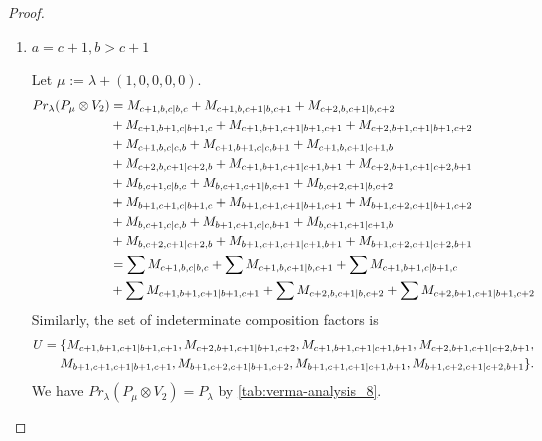 \begin{proof}
\begin{enumerate}
\begin{enumerate}
      \item $a=c+1, b>c+1$ \par
        Let $\mu:=\lambda + (1,0,0,0,0) $.
        \begin{equation}\notag
          \begin{aligned}
            Pr_{\lambda}(P_\mu \otimes V_{2}) &=
M_{c+1,b,c|b,c}
+ M_{c+1,b,c+1|b,c+1}
+ M_{c+2,b,c+1|b,c+2}\\
                                            &
+ M_{c+1,b+1,c|b+1,c}
+ M_{c+1,b+1,c+1|b+1,c+1}
+ M_{c+2,b+1,c+1|b+1,c+2}\\
                                            &
+ M_{c+1,b,c|c,b}
+ M_{c+1,b+1,c|c,b+1}
+ M_{c+1,b,c+1|c+1,b}\\
                                            &
+ M_{c+2,b,c+1|c+2,b}
+ M_{c+1,b+1,c+1|c+1,b+1}
+ M_{c+2,b+1,c+1|c+2,b+1}\\
                                            &
+ M_{b,c+1,c|b,c}
+ M_{b,c+1,c+1|b,c+1}
+ M_{b,c+2,c+1|b,c+2}\\
                                            &
+ M_{b+1,c+1,c|b+1,c}
+ M_{b+1,c+1,c+1|b+1,c+1}
+ M_{b+1,c+2,c+1|b+1,c+2}\\
                                            &
+ M_{b,c+1,c|c,b}
+ M_{b+1,c+1,c|c,b+1}
+ M_{b,c+1,c+1|c+1,b}\\
                                            &
+ M_{b,c+2,c+1|c+2,b}
+ M_{b+1,c+1,c+1|c+1,b+1}
+ M_{b+1,c+2,c+1|c+2,b+1} \\
                                               &=
\sum M_{c+1,b,c|b,c}
+ \sum M_{c+1,b,c+1|b,c+1}
+ \sum M_{c+1,b+1,c|b+1,c}\\
                                            &
+ \sum M_{c+1,b+1,c+1|b+1,c+1}
+ \sum M_{c+2,b,c+1|b,c+2}
+ \sum M_{c+2,b+1,c+1|b+1,c+2}
          \end{aligned}
        \end{equation}
      Similarly, the set of indeterminate composition factors is 
\begin{equation}\notag
  \begin{aligned}
    U = \{
M_{c+1,b+1,c+1|b+1,c+1},
M_{c+2,b+1,c+1|b+1,c+2},
M_{c+1,b+1,c+1|c+1,b+1},
M_{c+2,b+1,c+1|c+2,b+1},\\
M_{b+1,c+1,c+1|b+1,c+1},
M_{b+1,c+2,c+1|b+1,c+2},
M_{b+1,c+1,c+1|c+1,b+1},
M_{b+1,c+2,c+1|c+2,b+1}
\}.
  \end{aligned}
\end{equation}
       We have $Pr_{\lambda}(P_\mu \otimes V_{2}) = P_\lambda  $ by \cref{tab:verma-analysis_8}.

\end{enumerate}
\end{enumerate}
\end{proof}
